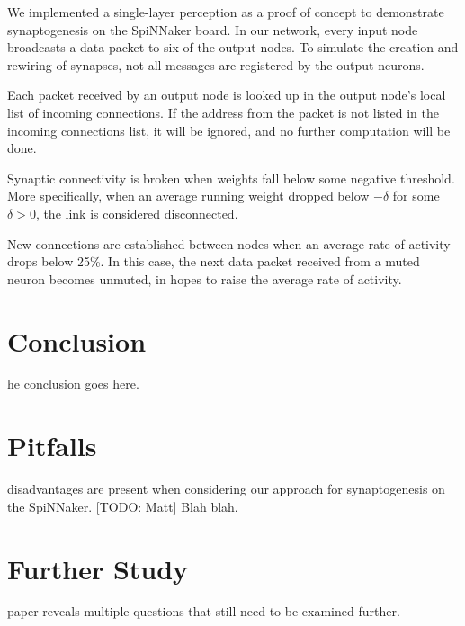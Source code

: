 \documentclass[journal]{./sty/IEEEtran}
\begin{document}
We implemented a single-layer perception as a proof of concept to demonstrate synaptogenesis on the SpiNNaker board. In our network, every input node broadcasts a data packet to six of the output nodes. To simulate the creation and rewiring of synapses, not all messages are registered by the output neurons. 

Each packet received by an output node is looked up in the output node's local list of incoming connections. If the address from the packet is not listed in the incoming connections list, it will be ignored, and no further computation will be done.

Synaptic connectivity is broken when weights fall below some negative threshold. More specifically, when an average running weight dropped below \(-\delta\) for some \(\delta > 0\), the link is considered disconnected.

New connections are established between nodes when an average rate of activity drops below 25\%. In this case, the next data packet received from a muted neuron becomes unmuted, in hopes to raise the average rate of activity.



\section{Conclusion}
he conclusion goes here.

\section{Pitfalls}
 disadvantages are present when considering our approach for synaptogenesis on the SpiNNaker. [TODO: Matt] Blah blah.

\section{Further Study}
 paper reveals multiple questions that still need to be examined further.


\end{document}
